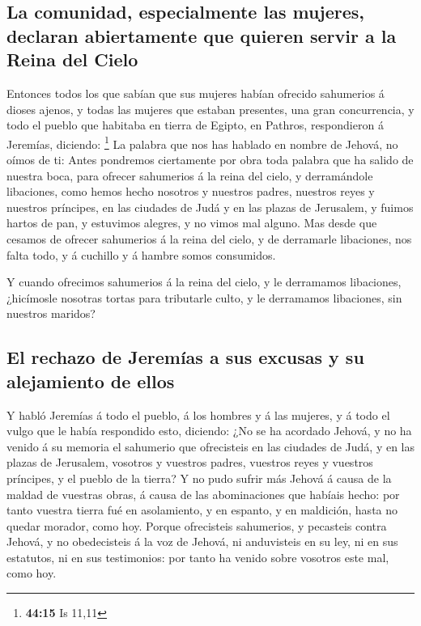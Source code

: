 \hypertarget{la-comunidad-especialmente-las-mujeres-declaran-abiertamente-que-quieren-servir-a-la-reina-del-cielo}{%
\subsection{La comunidad, especialmente las mujeres, declaran
abiertamente que quieren servir a la Reina del
Cielo}\label{la-comunidad-especialmente-las-mujeres-declaran-abiertamente-que-quieren-servir-a-la-reina-del-cielo}}

 Entonces todos los que sabían que sus mujeres habían
ofrecido sahumerios á dioses ajenos, y todas las mujeres que estaban
presentes, una gran concurrencia, y todo el pueblo que habitaba en
tierra de Egipto, en Pathros, respondieron á Jeremías, diciendo:
\footnote{\textbf{44:15} Is 11,11}  La palabra que nos has
hablado en nombre de Jehová, no oímos de ti:  Antes
pondremos ciertamente por obra toda palabra que ha salido de nuestra
boca, para ofrecer sahumerios á la reina del cielo, y derramándole
libaciones, como hemos hecho nosotros y nuestros padres, nuestros reyes
y nuestros príncipes, en las ciudades de Judá y en las plazas de
Jerusalem, y fuimos hartos de pan, y estuvimos alegres, y no vimos mal
alguno.  Mas desde que cesamos de ofrecer sahumerios á la
reina del cielo, y de derramarle libaciones, nos falta todo, y á
cuchillo y á hambre somos consumidos.

 Y cuando ofrecimos sahumerios á la reina del cielo, y le
derramamos libaciones, ¿hicímosle nosotras tortas para tributarle culto,
y le derramamos libaciones, sin nuestros maridos?

\hypertarget{el-rechazo-de-jeremuxedas-a-sus-excusas-y-su-alejamiento-de-ellos}{%
\subsection{El rechazo de Jeremías a sus excusas y su alejamiento de
ellos}\label{el-rechazo-de-jeremuxedas-a-sus-excusas-y-su-alejamiento-de-ellos}}

 Y habló Jeremías á todo el pueblo, á los hombres y á las
mujeres, y á todo el vulgo que le había respondido esto, diciendo:
 ¿No se ha acordado Jehová, y no ha venido á su memoria el
sahumerio que ofrecisteis en las ciudades de Judá, y en las plazas de
Jerusalem, vosotros y vuestros padres, vuestros reyes y vuestros
príncipes, y el pueblo de la tierra?  Y no pudo sufrir más
Jehová á causa de la maldad de vuestras obras, á causa de las
abominaciones que habíais hecho: por tanto vuestra tierra fué en
asolamiento, y en espanto, y en maldición, hasta no quedar morador, como
hoy.  Porque ofrecisteis sahumerios, y pecasteis contra
Jehová, y no obedecisteis á la voz de Jehová, ni anduvisteis en su ley,
ni en sus estatutos, ni en sus testimonios: por tanto ha venido sobre
vosotros este mal, como hoy.


